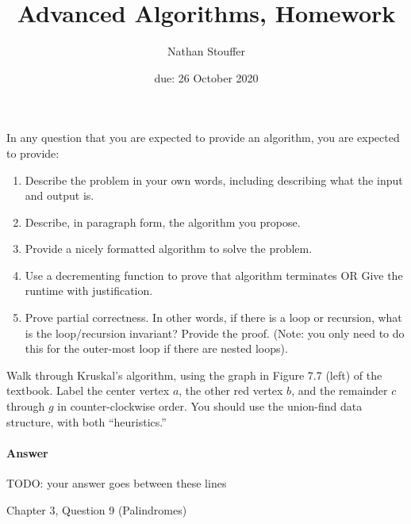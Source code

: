 \documentclass{article}
\title{Advanced Algorithms, Homework \hwnum}
\author{Nathan Stouffer}
\date{due: 26 October 2020}
\begin{document}
\maketitle

In any question that you are expected to provide an algorithm, you are
expected to provide:
\begin{enumerate}
    \item Describe the problem in your own words, including describing what the input and output is.
    \item Describe, in paragraph form, the algorithm you propose.
    \item Provide a nicely formatted algorithm to solve the problem.
    \item Use a decrementing function to prove that algorithm terminates OR  Give the runtime with justification.
    \item Prove partial correctness.
    In other words, if there is a loop or recursion, what is the loop/recursion invariant? Provide the proof.
    (Note: you only need to do this for the outer-most loop if there are nested loops).
\end{enumerate}



\nextprob
{}

Walk through Kruskal's algorithm, using the graph in Figure 7.7 (left) of the
textbook.  Label the center vertex $a$, the other red vertex $b$, and the
remainder $c$ through $g$ in counter-clockwise order.  You should use the
union-find data structure, with both ``heuristics.''

\paragraph{Answer}


TODO: your answer goes between these lines


\nextprob
{}

Chapter 3, Question 9 (Palindromes)
\end{document}
